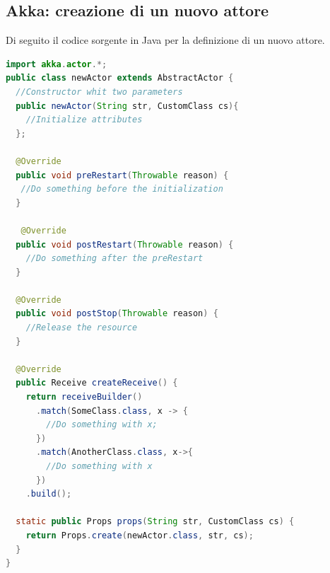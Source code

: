 \subsection{Akka: creazione di un nuovo attore}
\label{sec:akkanew}
Di seguito il codice sorgente in Java per la definizione di un nuovo attore.
\begin{lstlisting}[language=java]
import akka.actor.*;
public class newActor extends AbstractActor {
  //Constructor whit two parameters
  public newActor(String str, CustomClass cs){
    //Initialize attributes
  };

  @Override
  public void preRestart(Throwable reason) {
   //Do something before the initialization
  }
  
   @Override
  public void postRestart(Throwable reason) {
    //Do something after the preRestart
  }
  
  @Override
  public void postStop(Throwable reason) {
    //Release the resource
  }
  
  @Override
  public Receive createReceive() {
    return receiveBuilder()
      .match(SomeClass.class, x -> {
        //Do something with x;
      })
      .match(AnotherClass.class, x->{
        //Do something with x
      })
    .build();
  
  static public Props props(String str, CustomClass cs) {
    return Props.create(newActor.class, str, cs);
  }
}
\end{lstlisting}

